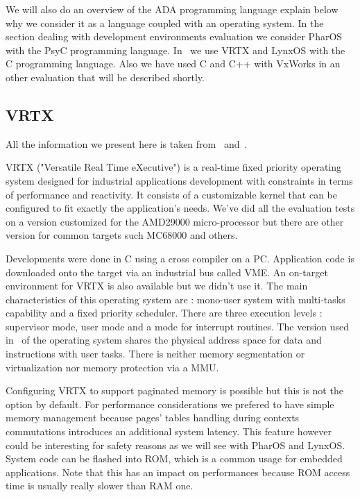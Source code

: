 \documentclass[10pt]{report}
\begin{document}
We will also do an overview of the ADA programming language 
explain below why we consider it as a language coupled with an 
operating system. In the section dealing with development 
environments evaluation we consider PharOS with the PsyC 
programming language. In~\cite{Delchini:95} we use VRTX and LynxOS 
with the C programming language. Also we have used C and C++ with 
VxWorks in an other evaluation that will be described shortly.

\subsection{VRTX}

All the information we present here is taken from~\cite{VRTX:90} and~\cite{AMD29000:91}.

VRTX ("Versatile Real Time eXecutive") is a real-time fixed 
priority operating system designed for industrial applications 
development with constraints in terms of performance and 
reactivity. It consists of a customizable kernel that can be 
configured to fit exactly the application's needs. We've did all 
the evaluation tests on a version customized for the AMD29000 
micro-processor but there are other version for common targets 
such MC68000 and others.

Developments were done in C using a cross compiler on a PC. 
Application code is downloaded onto the target via an industrial 
bus called VME. An on-target environment for VRTX is also 
available but we didn't use it. The main characteristics of this 
operating system are : mono-user system with multi-tasks 
capability and a fixed priority scheduler. There are three 
execution levels : supervisor mode, user mode and a mode for 
interrupt routines. The version used in~\cite{Delchini:95} of the 
operating system shares the physical address space for data and 
instructions with user tasks. There is neither memory 
segmentation or virtualization nor memory protection via a MMU.

Configuring VRTX to support paginated memory is possible but this 
is not the option by default. For performance considerations we 
prefered to have simple memory management because pages' tables 
handling during contexts commutations introduces an additional 
system latency. This feature however could be interesting for 
safety reasons as we will see with PharOS and LynxOS. System code 
can be flashed into ROM, which is a common usage for embedded 
applications. Note that this has an impact on performances 
because ROM access time is usually really slower than RAM one.
\end{document}
